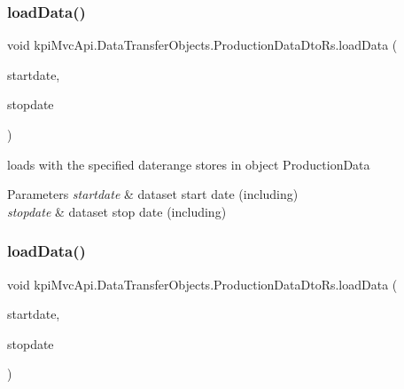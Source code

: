 \subsubsection{\texorpdfstring{load\+Data()}{loadData()}\hspace{0.1cm}{\footnotesize\ttfamily [5/6]}}
{\footnotesize\ttfamily void kpi\+Mvc\+Api.\+Data\+Transfer\+Objects.\+Production\+Data\+Dto\+Rs.\+load\+Data (\begin{DoxyParamCaption}\item[{Date\+Time}]{startdate,  }\item[{Date\+Time}]{stopdate }\end{DoxyParamCaption})\hspace{0.3cm}{\ttfamily [inline]}}



loads with the specified daterange stores in object {\ttfamily  Production\+Data } 


\begin{DoxyParams}{Parameters}
{\em startdate} & dataset start date (including)\\
\hline
{\em stopdate} & dataset stop date (including)\\
\hline
\end{DoxyParams}
\mbox{\label{classkpi_mvc_api_1_1_data_transfer_objects_1_1_production_data_dto_rs_a375b888daefaacc620cffef48ac7ab81}} 
\subsubsection{\texorpdfstring{load\+Data()}{loadData()}\hspace{0.1cm}{\footnotesize\ttfamily [6/6]}}
{\footnotesize\ttfamily void kpi\+Mvc\+Api.\+Data\+Transfer\+Objects.\+Production\+Data\+Dto\+Rs.\+load\+Data (\begin{DoxyParamCaption}\item[{Date\+Time}]{startdate,  }\item[{Date\+Time}]{stopdate }\end{DoxyParamCaption})\hspace{0.3cm}{\ttfamily [inline]}}



